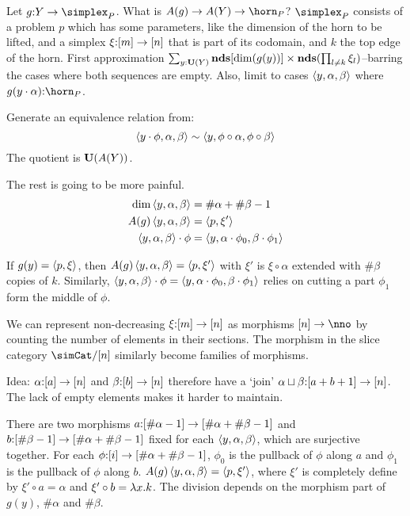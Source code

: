 \documentclass[csh.tex]{subfiles}
\begin{document}
%
Let $g\of Y\to \simplex_P$. What is $A(g)\to A(Y)\to \horn_P$?
$\simplex_P$ consists of a problem $p$ which has some parameters, like the dimension of the horn to be lifted, and a simplex $\xi\mathord :[m]\to [n]$ that is part of its codomain, and $k$ the top edge of the horn. 
First approximation $\sum_{y\mathord :\mathbf{U}(Y)} \mathbf{nds}[\dim(g(y))]\times\mathbf{nds}(\prod_{l\neq k} \xi_l)$--barring the cases where both sequences are empty. Also, limit to cases $\left\langle y,\alpha,\beta \right\rangle$ where $g(y\cdot\alpha)\of\horn_P$.

Generate an equivalence relation from:
\[\left\langle y\cdot\phi,\alpha,\beta \right\rangle\sim \left\langle y,\phi\circ \alpha,\phi\circ \beta \right\rangle\]
The quotient is $\mathbf{U}(A(Y))$.

The rest is going to be more painful. 
\begin{align*}
\dim\left\langle y,\alpha,\beta \right\rangle &= \#\alpha+\#\beta-1\\
A(g)\left\langle y,\alpha,\beta \right\rangle &= \left\langle p,\xi' \right\rangle\\
\left\langle y,\alpha,\beta \right\rangle\cdot\phi &= \left\langle y,\alpha\cdot\phi_0,\beta\cdot\phi_1 \right\rangle
\end{align*}

If $g(y) = \left\langle p,\xi \right\rangle$, then $A(g)\left\langle y,\alpha,\beta \right\rangle = \left\langle p,\xi' \right\rangle$ with $\xi'$ is $\xi\circ\alpha$ extended with $\#\beta$ copies of $k$. 
Similarly, $\left\langle y,\alpha,\beta \right\rangle\cdot\phi = \left\langle y,\alpha\cdot\phi_0,\beta\cdot\phi_1 \right\rangle$ relies on cutting a part $\phi_1$ form the middle of $\phi$.

We can represent non-decreasing $\xi\mathord :[m]\to [n]$ as morphisms $[n]\to \nno$ by counting the number of elements in their sections. The morphism in the slice category $\simCat/[n]$ similarly become families of morphisms.

Idea: $\alpha\mathord :[a]\to[n]$ and $\beta\mathord :[b]\to[n]$ therefore have a `join' $\alpha\sqcup\beta\mathord :[a + b + 1]\to[n]$. The lack of empty elements makes it harder to maintain.

There are two morphisms $a\mathord : [\#\alpha - 1]\to[\#\alpha + \#\beta - 1]$ and $b\mathord :[\#\beta - 1]\to[\#\alpha + \#\beta - 1]$ fixed for each $\left\langle y,\alpha,\beta \right\rangle$, which are surjective together. For each $\phi\mathord : [i] \to [\#\alpha + \#\beta - 1]$, $\phi_0$ is the pullback of $\phi$ along $a$ and $\phi_1$ is the pullback of $\phi$ along $b$. $A(g)\left\langle y,\alpha,\beta \right\rangle = \left\langle p,\xi' \right\rangle$, where $\xi'$ is completely define by $\xi'\circ a = \alpha$ and $\xi'\circ b = \lambda x .k$. The division depends on the morphism part of $g(y)$, $\#\alpha$ and $\#\beta$.
\end{document}
